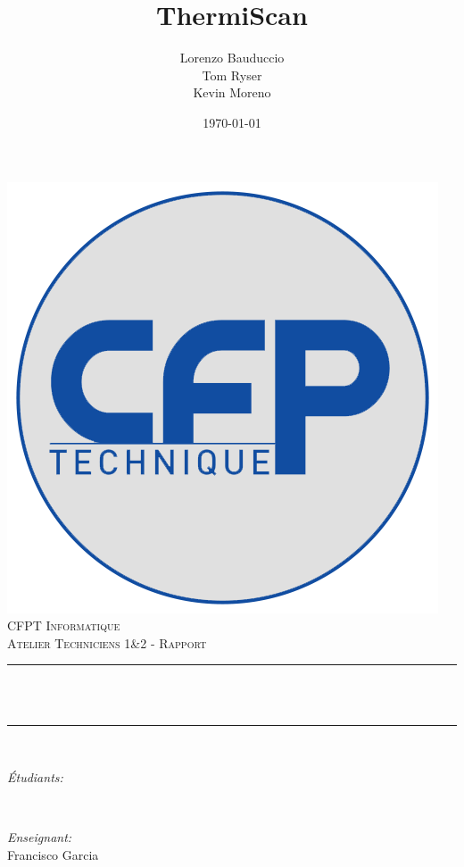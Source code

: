 \documentclass[12pt]{article}
\title{ThermiScan}
\author{Lorenzo Bauduccio \\ Tom Ryser \\ Kevin Moreno}
\date{\today}
\makeatletter
\let\thetitle\@title
\let\theauthor\@author
\let\thedate\@date
\makeatother
\begin{document}

\begin{titlepage}
	\centering
    \includegraphics[scale = 1]{logo-cfpt-site.png}\\[1.5 cm]
    \textsc{\LARGE CFPT Informatique}\\[2.0 cm]
	\textsc{\Large Atelier Techniciens 1\&2 - Rapport}\\[0.5 cm]
	\rule{\linewidth}{0.2 mm} \\[0.4 cm]
	{ \huge \bfseries \thetitle}\\
	\rule{\linewidth}{0.2 mm} \\[1.5 cm]
	
	\begin{minipage}{0.4\textwidth}
		\begin{flushleft} \large
			\emph{Étudiants:}\\
			\theauthor
			\end{flushleft}
			\end{minipage}~
			\begin{minipage}{0.4\textwidth}
			\begin{flushright} \large
			\emph{Enseignant:} \\
			Francisco Garcia
		\end{flushright}
	\end{minipage}\\[2 cm]
	
	{\large \thedate}\\[0.5 cm]
 
	\vfill
	
\end{titlepage}
\end{document}
